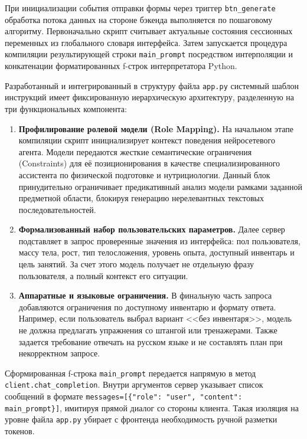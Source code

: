 \documentclass[14pt, a4paper]{extarticle}
\begin{document}
При инициализации события отправки формы через триггер \texttt{btn\_generate} обработка потока данных на стороне бэкенда выполняется по пошаговому алгоритму. Первоначально скрипт считывает актуальные состояния сессионных переменных из глобального словаря интерфейса. Затем запускается процедура компиляции результирующей строки \texttt{main\_prompt} посредством интерполяции и конкатенации форматированных f-строк интерпретатора Python.

Разработанный и интегрированный в структуру файла \texttt{app.py} системный шаблон инструкций имеет фиксированную иерархическую архитектуру\cite{promt_eng}, разделенную на три функциональных компонента:
\begin{enumerate}
    \item \textbf{Профилирование ролевой модели (Role Mapping).} 
    На начальном этапе компиляции скрипт инициализирует контекст поведения нейросетевого агента. Модели передаются жесткие семантические ограничения (Constraints) для её позиционирования в качестве специализированного ассистента по физической подготовке и нутрициологии. Данный блок принудительно ограничивает предикативный анализ модели рамками заданной предметной области, блокируя генерацию нерелевантных текстовых последовательностей.

    \item \textbf{Формализованный набор пользовательских параметров.} 
    Далее сервер подставляет в запрос проверенные значения из интерфейса: пол пользователя, массу тела, рост, тип телосложения, уровень опыта, доступный инвентарь и цель занятий. За счет этого модель получает не отдельную фразу пользователя, а полный контекст его ситуации.

    \item \textbf{Аппаратные и языковые ограничения.} 
    В финальную часть запроса добавляются ограничения по доступному инвентарю и формату ответа. Например, если пользователь выбрал вариант <<без инвентаря>>, модель не должна предлагать упражнения со штангой или тренажерами. Также задается требование отвечать на русском языке и не составлять план при некорректном запросе.
\end{enumerate}

Сформированная f-строка \texttt{main\_prompt} передается напрямую в метод \texttt{client.chat\_completion}. Внутри аргументов сервер указывает список сообщений в формате \verb|messages=[{"role": "user", "content": main_prompt}]|, имитируя прямой диалог со стороны клиента. Такая изоляция на уровне файла \texttt{app.py} убирает с фронтенда необходимость ручной разметки токенов.
\end{document}
